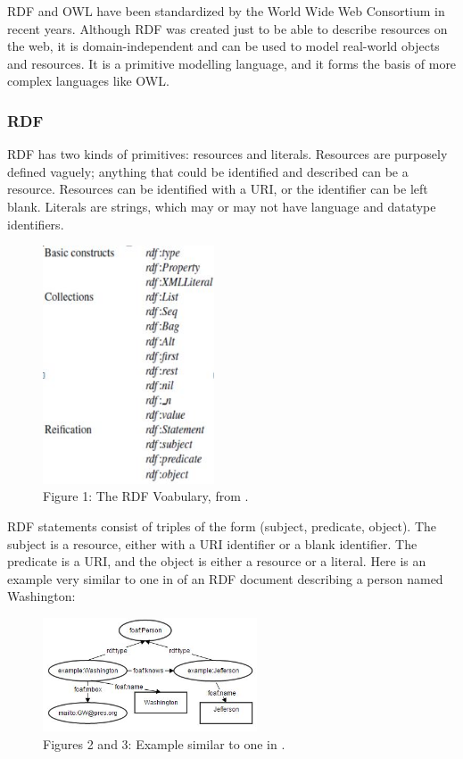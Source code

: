 \documentclass[10pt,journal,compsoc]{IEEEtran}
\begin{document}
RDF and OWL have been standardized by the World Wide Web Consortium in recent years.  Although RDF was created just to be able to describe resources on the web, it is domain-independent and can be used to model real-world objects and resources.  It is a primitive modelling language, and it forms the basis of more complex languages like OWL.



\subsubsection{RDF}
RDF has two kinds of primitives: resources and literals.  Resources are purposely defined vaguely; anything that could be identified and described can be a resource.  Resources can be identified with a URI, or the identifier can be left blank.  Literals are strings, which may or may not have language and datatype identifiers.

\begin{figure}[htbp] %
   \centering
   \includegraphics[width=2in]{RDFVocabPic.jpg} 
\caption*{Figure 1: The RDF Voabulary, from \cite{_social_2007}.}
   \label{}
\label{}   
\end{figure}


RDF statements consist of triples of the form (subject, predicate, object).  The subject is a resource, either with a URI identifier or a blank identifier.  The predicate is a URI, and the object is either a resource or a literal.  Here is an example very similar to one in \cite{_social_2007} of an RDF document describing a person named Washington: 

\begin{figure}[h] %
   \centering
   \includegraphics[width=2.5in]{WashJeffPic.jpg} 
\caption*{Figures 2 and 3: Example similar to one in \cite{_social_2007}.}
   \label{}
\label{}   
\end{figure}
\end{document}
